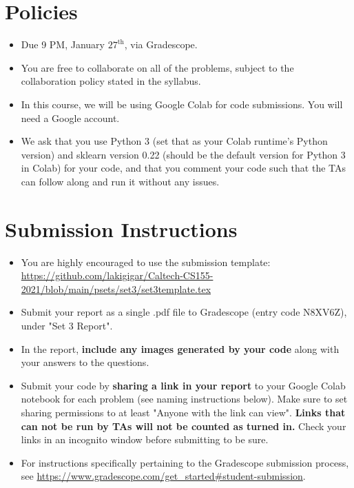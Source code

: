 \newif\ifshowsolutions







\pagestyle{fancy}




\section*{Policies}
\begin{itemize}
  \item Due 9 PM, January $27^\text{th}$, via Gradescope.
  \item You are free to collaborate on all of the problems, subject to the collaboration policy stated in the syllabus.
  \item In this course, we will be using Google Colab for code submissions. You will need a Google account.
  \item We ask that you use Python 3 (set that as your Colab runtime's Python version) and sklearn version 0.22 (should be the default version for Python 3 in Colab) for your code, and that you comment your code such that the TAs can follow along and run it without any issues.
\end{itemize}

\section*{Submission Instructions}
\begin{itemize}
   \item You are highly encouraged to use the submission template: \url{https://github.com/lakigigar/Caltech-CS155-2021/blob/main/psets/set3/set3template.tex}
   \item Submit your report as a single .pdf file to Gradescope (entry code N8XV6Z), under "Set 3 Report". 
   \item In the report, \textbf{include any images generated by your code} along with your answers to the questions.
   \item Submit your code by \textbf{sharing a link in your report} to your Google Colab notebook for each problem (see naming instructions below). Make sure to set sharing permissions to at least "Anyone with the link can view". \textbf{Links that can not be run by TAs will not be counted as turned in.} Check your links in an incognito window before submitting to be sure. 
   \item For instructions specifically pertaining to the Gradescope submission process, see \url{https://www.gradescope.com/get_started#student-submission}.

\end{itemize}

